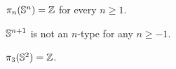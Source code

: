 \documentclass[hott-all.tex]{subfiles}
\begin{document}
%
%
% 
\begin{thm}
$\pi_n(\mathbb{S}^n)=\mathbb{Z}$ for every $n\geq 1$.
\end{thm}
% 
% 
\begin{cor}
  $\mathbb{S}^{n+1}$ is not an $n$-type for any $n\ge -1$.
\end{cor}
% 
\begin{cor}
  $\pi_3(\mathbb{S}^2)=\mathbb{Z}$.
\end{cor}
% 
\end{document}
